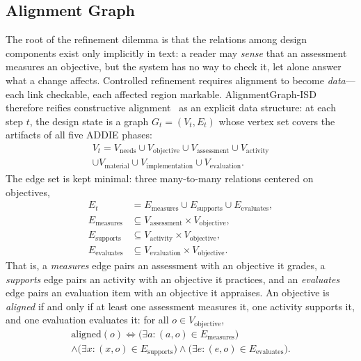 \subsection{Alignment Graph}
\label{sec:alignment-graph}

The root of the refinement dilemma is that the relations among design components exist only implicitly in text: a reader may \emph{sense} that an assessment measures an objective, but the system has no way to check it, let alone answer what a change affects. Controlled refinement requires alignment to become \emph{data}---each link checkable, each affected region markable. AlignmentGraph-ISD therefore reifies constructive alignment~\cite{biggs1996enhancing} as an explicit data structure: at each step $t$, the design state is a graph $G_t = (V_t, E_t)$ whose vertex set covers the artifacts of all five ADDIE phases:
\begin{multline*}
V_t = V_{\mathrm{needs}} \cup V_{\mathrm{objective}} \cup V_{\mathrm{assessment}} \cup V_{\mathrm{activity}} \\
 \cup V_{\mathrm{material}} \cup V_{\mathrm{implementation}} \cup V_{\mathrm{evaluation}}.
\end{multline*}
The edge set is kept minimal: three many-to-many relations centered on objectives,
\begin{align*}
E_t &= E_{\mathrm{measures}} \cup E_{\mathrm{supports}} \cup E_{\mathrm{evaluates}},\\
E_{\mathrm{measures}} &\subseteq V_{\mathrm{assessment}} \times V_{\mathrm{objective}},\\
E_{\mathrm{supports}} &\subseteq V_{\mathrm{activity}} \times V_{\mathrm{objective}},\\
E_{\mathrm{evaluates}} &\subseteq V_{\mathrm{evaluation}} \times V_{\mathrm{objective}}.
\end{align*}
That is, a \textsl{measures} edge pairs an assessment with an objective it grades, a \textsl{supports} edge pairs an activity with an objective it practices, and an \textsl{evaluates} edge pairs an evaluation item with an objective it appraises. An objective is \emph{aligned} if and only if at least one assessment measures it, one activity supports it, and one evaluation evaluates it: for all $o \in V_{\mathrm{objective}}$,
\begin{multline*}
\mathrm{aligned}(o) \iff \big(\exists a\colon (a,o) \in E_{\mathrm{measures}}\big) \\
 \wedge \big(\exists x\colon (x,o) \in E_{\mathrm{supports}}\big) \wedge \big(\exists e\colon (e,o) \in E_{\mathrm{evaluates}}\big).
\end{multline*}

